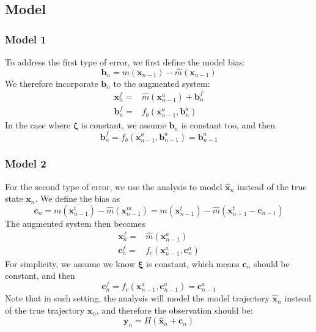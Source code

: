 \documentclass{article}
\begin{document}
\subsection{Model}
\subsubsection{Model 1}
To address the first type of error, we first define the model bias:
\begin{equation}
\pmb{b}_{n}=m(\pmb{x}_{n-1})-\hat{m}(\pmb{x}_{n-1})
\end{equation}
We therefore incorporate $\pmb{b}_n$ to the augmented system:
\begin{align}
\pmb{x}_{n}^{f}=&\hat{m}(\pmb{x}_{n-1}^{a})+\pmb{b}_{n}^{f}\\
\pmb{b}_{n}^{f}=&f_{b}(\pmb{x}_{n-1}^{a},\pmb{b}_{n}^{a})
\end{align}
In the case where $\pmb{\zeta}$ is constant, we assume $\pmb{b}_n$ is constant too, and then
\begin{equation}
\pmb{b}_{n}^{f}=f_{b}(\pmb{x}_{n-1}^{a},\pmb{b}_{n-1}^{a})=\pmb{b}_{n-1}^{a}
\end{equation}
\subsubsection{Model 2}
For the second type of error, we use the analysis to model $\hat{\pmb{x}}_n$ instead of the true state $\pmb{x}_n$. We define the bias as
\begin{equation}
\pmb{c}_{n}=m(\pmb{x}_{n-1}^{t})-\hat{m}(\pmb{x}_{n-1}^{m})=m(\pmb{x}_{n-1}^{t})-\hat{m}(\pmb{x}_{n-1}^{t}-\pmb{c}_{n-1})
\end{equation}
The augmented system then becomes
\begin{align}
\pmb{x}_{n}^{f}=&\hat{m}(\pmb{x}_{n-1}^{a})\\
\pmb{c}_{n}^{f}=&f_{c}(\pmb{x}_{n-1}^{a},\pmb{c}_{n}^{a})
\end{align}
For simplicity, we assume we know $\pmb{\xi}$ is constant, which means $\pmb{c}_n$ should be constant, and then
\begin{equation}
\pmb{c}_{n}^{f}=f_{c}(\pmb{x}_{n-1}^{a},\pmb{c}_{n-1}^{a})=\pmb{c}_{n-1}^{a}
\end{equation} 
Note that in such setting, the analysis will model the model trajectory $\hat{\pmb{x}}_{n}$ instead of the true trajectory $\pmb{x}_n$, and therefore the observation should be:
\begin{equation}
\pmb{y}_n=H(\hat{\pmb{x}}_n+\pmb{c}_n)
\end{equation}
\end{document}
